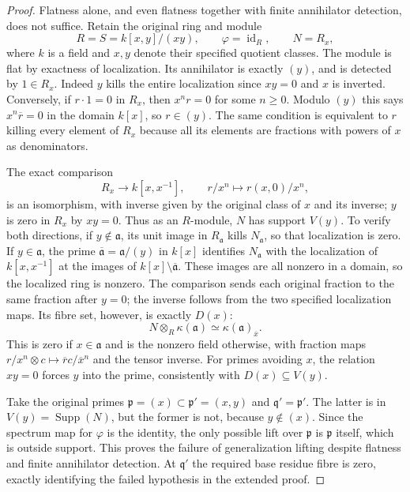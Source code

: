 \begin{proof}
Flatness alone, and even flatness together with
finite annihilator detection, does not suffice.
Retain the original ring and module
$$
R=S=k[x,y]/(xy),\qquad \varphi=\operatorname{id}_R,
\qquad N=R_x,
$$
where $k$ is a field and $x,y$ denote their
specified quotient classes. The module is flat
by exactness of localization. Its annihilator
is exactly $(y)$, and is detected by $1\in R_x$.
Indeed $y$ kills the entire localization since
$xy=0$ and $x$ is inverted. Conversely, if
$r\cdot1=0$ in $R_x$, then $x^nr=0$ for some
$n\geq0$. Modulo $(y)$ this says
$x^n\overline r=0$ in the domain $k[x]$,
so $r\in(y)$. The same condition is equivalent
to $r$ killing every element of $R_x$ because
all its elements are fractions with powers
of $x$ as denominators.

The exact comparison
$$
R_x\longrightarrow k[x,x^{-1}],\qquad
r/x^n\longmapsto r(x,0)/x^n,
$$
is an isomorphism, with inverse given by the
original class of $x$ and its inverse; $y$ is
zero in $R_x$ by $xy=0$. Thus as an $R$-module,
$N$ has support $V(y)$. To verify both directions,
if $y\notin\mathfrak a$, its unit image in
$R_{\mathfrak a}$ kills $N_{\mathfrak a}$,
so that localization is zero. If
$y\in\mathfrak a$, the prime
$\overline{\mathfrak a}=\mathfrak a/(y)$
in $k[x]$ identifies $N_{\mathfrak a}$ with
the localization of $k[x,x^{-1}]$ at the
images of $k[x]\setminus\overline{\mathfrak a}$.
These images are all nonzero in a domain,
so the localized ring is nonzero. The comparison
sends each original fraction to the same
fraction after $y=0$; the inverse follows from
the two specified localization maps.
Its fibre set, however, is exactly $D(x)$:
$$
N\otimes_R\kappa(\mathfrak a)
\simeq\kappa(\mathfrak a)_{\overline x}.
$$
This is zero if $x\in\mathfrak a$ and is the
nonzero field otherwise, with fraction maps
$r/x^n\otimes c\mapsto\overline r c/\overline x^n$
and the tensor inverse. For primes avoiding
$x$, the relation $xy=0$ forces $y$ into the
prime, consistently with $D(x)\subseteq V(y)$.

Take the original primes
$\mathfrak p=(x)\subset\mathfrak p'=(x,y)$
and $\mathfrak q'=\mathfrak p'$. The latter
is in $V(y)=\operatorname{Supp}(N)$, but the
former is not, because $y\notin(x)$.
Since the spectrum map for $\varphi$ is the
identity, the only possible lift over
$\mathfrak p$ is $\mathfrak p$ itself, which
is outside support. This proves the failure
of generalization lifting despite flatness
and finite annihilator detection. At
$\mathfrak q'$ the required base residue fibre
is zero, exactly identifying the failed
hypothesis in the extended proof.
\end{proof}